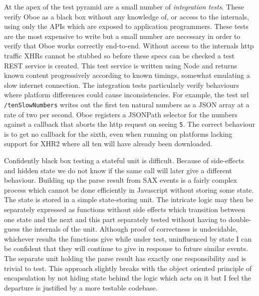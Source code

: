 \documentclass[]{article}
\begin{document}
At the apex of the test pyramid are a small number of \emph{integration
tests}. These verify Oboe as a black box without any knowledge of, or
access to the internals, using only the APIs which are exposed to
application programmers. These tests are the most expensive to write but
a small number are necessary in order to verify that Oboe works
correctly end-to-end. Without access to the internals http traffic XHRs
cannot be stubbed so before these specs can be checked a test REST
service is created. This test service is written using Node and returns
known content progressively according to known timings, somewhat
emulating a slow internet connection. The integration tests particularly
verify behaviours where platform differences could cause
inconsistencies. For example, the test url \texttt{/tenSlowNumbers}
writes out the first ten natural numbers as a JSON array at a rate of
two per second. Oboe registers a JSONPath selector for the numbers
against a callback that aborts the http request on seeing \texttt{5}.
The correct behaviour is to get no callback for the sixth, even when
running on platforms lacking support for XHR2 where all ten will have
already been downloaded.

Confidently black box testing a stateful unit is difficult. Because of
side-effects and hidden state we do not know if the same call will later
give a different behaviour. Building up the parse result from SAX events
is a fairly complex process which cannot be done efficiently in
Javascript without storing some state. The state is stored in a simple
state-storing unit. The intricate logic may then be separately expressed
as functions without side effects which transition between one state and
the next and this part separately tested without having to double-guess
the internals of the unit. Although proof of correctness is undecidable,
whichever results the functions give while under test, uninfluenced by
state I can be confident that they will continue to give in response to
future similar events. The separate unit holding the parse result has
exactly one responsibility and is trivial to test. This approach
slightly breaks with the object oriented principle of encapsulation by
not hiding state behind the logic which acts on it but I feel the
departure is justified by a more testable codebase.
\end{document}
